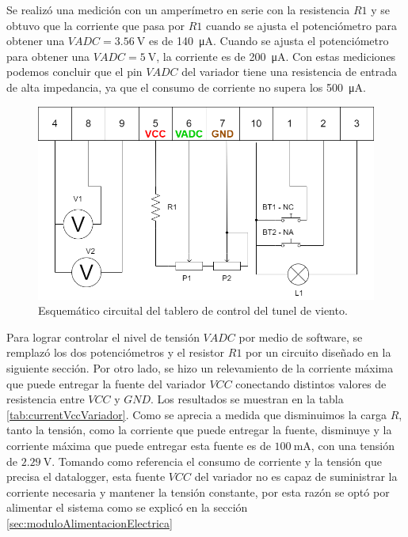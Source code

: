 Se realizó una medición con un amperímetro en serie con la resistencia $R1$ y se obtuvo que la corriente que pasa por $R1$ cuando se ajusta el potenciómetro para obtener una $VADC = \SI{3.56}{\volt}$ es de \SI{140}{\micro\ampere}. Cuando se ajusta el potenciómetro para obtener una $VADC = \SI{5}{\volt}$, la corriente es de \SI{200}{\micro\ampere}. Con estas mediciones podemos concluir que el pin $VADC$ del variador tiene una resistencia de entrada de alta impedancia, ya que el consumo de corriente no supera los \SI{500}{\micro\ampere}.







\begin{figure}[H]
    \centering
    \includegraphics[width=0.7\linewidth]{Figuras/datalogger/Hardware/esquemCircuitoControlTunel.png}
    \caption{Esquemático circuital del tablero de control del tunel de viento.}
    \label{fig:esquemCircuitoControlTunel}
\end{figure}

Para lograr controlar el nivel de tensión $VADC$ por medio de software, se remplazó los dos potenciómetros y el resistor $R1$ por un circuito diseñado en la siguiente sección. Por otro lado, se hizo un relevamiento de la corriente máxima que puede entregar la fuente del variador $VCC$ conectando distintos valores de resistencia entre $VCC$ y $GND$. Los resultados se muestran en la tabla \ref{tab:currentVccVariador}. Como se aprecia a medida que disminuimos la carga $R$, tanto la tensión, como la corriente que puede entregar la fuente, disminuye y la corriente máxima que puede entregar esta fuente es de $\SI{100}{\milli\ampere}$, con una tensión de $\SI{2.29}{\volt}$. Tomando como referencia el consumo de corriente y la tensión que precisa el datalogger, esta fuente $VCC$ del variador no es capaz de suministrar la corriente necesaria y mantener la tensión constante, por esta razón se optó por alimentar el sistema como se explicó en la sección \ref{sec:moduloAlimentacionElectrica}




